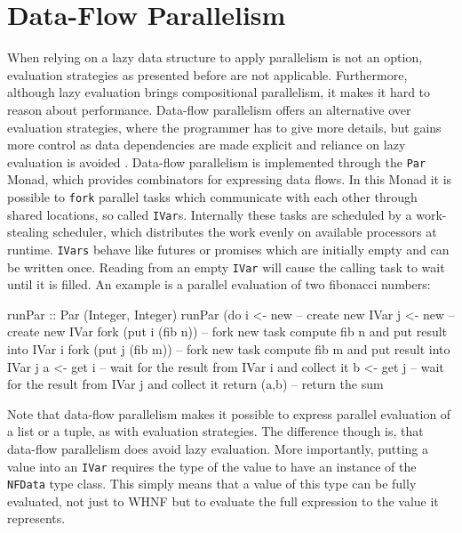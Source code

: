 \section{Data-Flow Parallelism}
When relying on a lazy data structure to apply parallelism is not an option, evaluation strategies as presented before are not applicable. Furthermore, although lazy evaluation brings compositional parallelism, it makes it hard to reason about performance. Data-flow parallelism offers an alternative over evaluation strategies, where the programmer has to give more details, but gains more control as data dependencies are made explicit and reliance on lazy evaluation is avoided \cite{marlow_monad_2011}.
Data-flow parallelism is implemented through the \texttt{Par} Monad, which provides combinators for expressing data flows. In this Monad it is possible to \texttt{fork} parallel tasks which communicate with each other through shared locations, so called \texttt{IVar}s. Internally these tasks are scheduled by a work-stealing scheduler, which distributes the work evenly on available processors at runtime. \texttt{IVars} behave like futures or promises which are initially empty and can be written once. Reading from an empty \texttt{IVar} will cause the calling task to wait until it is filled. An example is a parallel evaluation of two fibonacci numbers:

\begin{HaskellCode}
runPar :: Par (Integer, Integer)
runPar (do
  i <- new             -- create new IVar
  j <- new             -- create new IVar
  fork (put i (fib n)) -- fork new task compute fib n and put result into IVar i
  fork (put j (fib m)) -- fork new task compute fib m and put result into IVar j
  a <- get i           -- wait for the result from IVar i and collect it
  b <- get j           -- wait for the result from IVar j and collect it
  return (a,b)         -- return the sum
\end{HaskellCode}

Note that data-flow parallelism makes it possible to express parallel evaluation of a list or a tuple, as with evaluation strategies. The difference though is, that data-flow parallelism does avoid lazy evaluation. More importantly, putting a value into an \texttt{IVar} requires the type of the value to have an instance of the \texttt{NFData} type class. This simply means that a value of this type can be fully evaluated, not just to WHNF but to evaluate the full expression to the value it represents.

